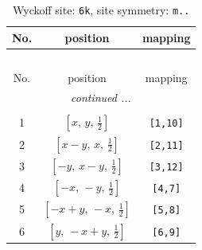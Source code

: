 \documentclass[fleqn,8pt]{jsarticle}
\begin{document}
\renewcommand{\arraystretch}{1.2}
\begin{longtable}{ccc}
\caption{Wyckoff site: {\tt 6k}, site symmetry: {\tt m..}}
 \\
 \hline \hline
No. & position & mapping \\ \hline \endfirsthead

\multicolumn{2}{l}{\tablename\ \thetable{}} \\
 \hline \hline
No. & position & mapping \\ \hline \endhead

 \hline \hline
\multicolumn{2}{r}{\footnotesize\it continued ...} \\ \endfoot

 \hline \hline
\multicolumn{2}{r}{} \\ \endlastfoot

1 & $\left[ x,\, y,\, \frac{1}{2} \right]$ & {\tt [1,10]} \\ \hline
2 & $\left[ x - y,\, x,\, \frac{1}{2} \right]$ & {\tt [2,11]} \\ \hline
3 & $\left[ - y,\, x - y,\, \frac{1}{2} \right]$ & {\tt [3,12]} \\ \hline
4 & $\left[ - x,\, - y,\, \frac{1}{2} \right]$ & {\tt [4,7]} \\ \hline
5 & $\left[ - x + y,\, - x,\, \frac{1}{2} \right]$ & {\tt [5,8]} \\ \hline
6 & $\left[ y,\, - x + y,\, \frac{1}{2} \right]$ & {\tt [6,9]} \\
\end{longtable}
\renewcommand{\arraystretch}{1.2}
\end{document}
